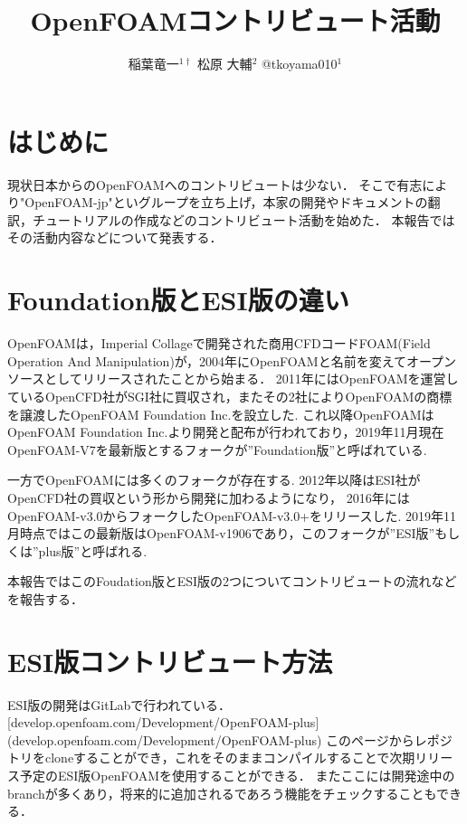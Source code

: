 \documentclass{ltjoc}
\title{OpenFOAMコントリビュート活動}
\author{%
稲葉竜一$^{1\dagger}$%
\hspace{1\zw}%
松原 大輔$^{2}$%
\hspace{1\zw}%
@tkoyama010$^{1}$%
}
\affiliation{%
${}^{1}$OpenFOAM-jp%
\hspace{1\zw}%
${}^{2}$オープン CAE勉強会%
}
\begin{document}
\maketitle
\section{はじめに}
現状日本からのOpenFOAMへのコントリビュートは少ない．
そこで有志により"OpenFOAM-jp"といグループを立ち上げ，本家の開発やドキュメントの翻訳，チュートリアルの作成などのコントリビュート活動を始めた．
本報告ではその活動内容などについて発表する．
\section{Foundation版とESI版の違い}
OpenFOAMは，Imperial Collageで開発された商用CFDコードFOAM(Field Operation And Manipulation)が，2004年にOpenFOAMと名前を変えてオープンソースとしてリリースされたことから始まる．\cite{URL:openfoam.history}\cite{Minabe:OpenCAE2015-GP23}
2011年にはOpenFOAMを運営しているOpenCFD社がSGI社に買収され，またその2社によりOpenFOAMの商標を譲渡したOpenFOAM Foundation Inc.を設立した.
これ以降OpenFOAMはOpenFOAM Foundation Inc.より開発と配布が行われており，2019年11月現在OpenFOAM-V7を最新版とするフォークが”Foundation版”\cite{URL:openfoam.org}\cite{URL:GitHub-foundation}と呼ばれている.

一方でOpenFOAMには多くのフォークが存在する.
2012年以降はESI社がOpenCFD社の買収という形から開発に加わるようになり，
2016年にはOpenFOAM-v3.0からフォークしたOpenFOAM-v3.0+をリリースした.
2019年11月時点ではこの最新版はOpenFOAM-v1906であり，このフォークが”ESI版”\cite{URL:openfoam.com}\cite{URL:GitLab-plus}もしくは”plus版”と呼ばれる.

本報告ではこのFoudation版とESI版の2つについてコントリビュートの流れなどを報告する．
%
\section{ESI版コントリビュート方法}
ESI版の開発はGitLabで行われている．[develop.openfoam.com/Development/OpenFOAM-plus](develop.openfoam.com/Development/OpenFOAM-plus)
このページからレポジトリをcloneすることができ，これをそのままコンパイルすることで次期リリース予定のESI版OpenFOAMを使用することができる．
またここには開発途中のbranchが多くあり，将来的に追加されるであろう機能をチェックすることもできる．
\end{document}
